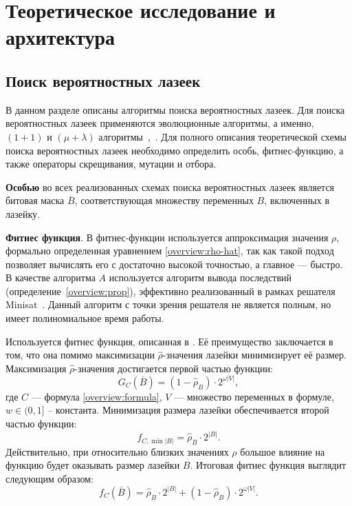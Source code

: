 \chapter{Теоретическое исследование и архитектура}\label{arch}


\section{Поиск вероятностных лазеек}\label{arch:rbs:schema}

В данном разделе описаны алгоритмы поиска вероятностных лазеек.
Для поиска вероятностных лазеек применяются эволюционные алгоритмы, а именно, $(1 + 1)$ и $(\mu + \lambda)$
алгоритмы~\cite{bib:ea},~\cite{bib:ga}. Для полного описания теоретической схемы поиска
вероятностных лазеек необходимо определить особь, фитнес-функцию, а также операторы скрещивания,
мутации и отбора.

\textbf{Особью} во всех реализованных схемах поиска вероятностных лазеек является битовая маска
$\overline{B}$, соответствующая множеству переменных $B$, включенных в лазейку.

\textbf{Фитнес функция}. В фитнес-функции используется аппроксимация значения $\rho$, формально 
определенная уравнением \ref{overview:rho-hat}, так как такой
подход позволяет вычислять его с достаточно высокой точностью, а главное --- быстро. В качестве
алгоритма $A$ используется алгоритм вывода последствий (определение~\ref{overview:prop}), 
эффективно реализованный в рамках решателя Minisat~\cite{bib:minisat}. Данный алгоритм с точки 
зрения решателя не является полным, но имеет полиномиальное время работы.

Используется фитнес функция, описанная в . Её преимущество заключается в том, что она помимо
максимизации $\hat{\rho}$-значения лазейки минимизирует её размер. Максимизация $\hat{\rho}$-значения 
достигается первой частью функции:
\[
    G_{C}\left(\overline{B}\right) = (1 - \hat{\rho}_B) \cdot 2^{\omega |V|},
\]
где $C$ --- формула \ref{overview:formula}, $V$ --- множество переменных в формуле, $w \in (0, 1]$
-- константа. Минимизация размера лазейки обеспечивается второй частью функции:
\[
    f_{C, \min{|B|}} = \hat{\rho}_B \cdot 2^{|B|}.
\]
Действительно, при относительно близких значениях $\rho$ большое влияние на функцию будет оказывать
размер лазейки $B$. Итоговая фитнес функция выглядит следующим образом:
\begin{equation}
    f_{C}\left(\overline{B}\right) = \hat{\rho}_B \cdot 2^{|B|} + (1 - \hat{\rho}_B) \cdot 2^{\omega |V|}.
    \label{arch:fitness}
\end{equation}

